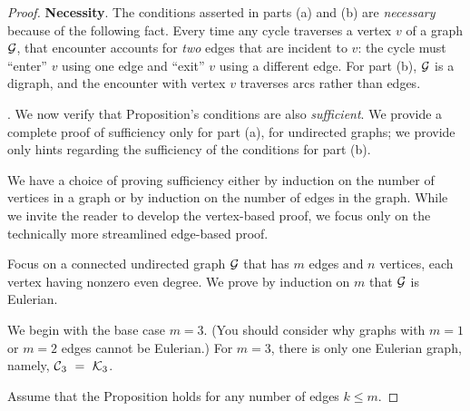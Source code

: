 \begin{proof}
{\bf Necessity}.
The conditions asserted in parts (a) and (b) are {\em necessary} because of the following fact.  Every time any cycle traverses a vertex $v$ of a graph $\mbox{$\cal G$}$, that encounter accounts for {\em two} edges that are incident to $v$: the cycle must ``enter'' $v$ using one edge and ``exit'' $v$ using a different edge.   For part (b), $\mbox{$\cal G$}$ is a digraph, and the encounter with vertex $v$ traverses arcs rather than edges.

\medskip

.
We now verify that Proposition's conditions are also {\em sufficient}.  We provide  a complete proof of sufficiency only for part (a), for undirected graphs; we provide only hints regarding the sufficiency of the conditions for part (b).

\smallskip

We have a choice of proving sufficiency either by induction on the number of vertices in a 
graph or by induction on the number of edges in the graph.  While we invite the reader to 
develop the vertex-based proof, we focus only on the technically more streamlined edge-based proof. 

\medskip

Focus on a connected undirected graph $\mbox{$\cal G$}$ that has $m$ edges and $n$ vertices, each vertex having nonzero even degree.  We prove by induction on $m$ that $\mbox{$\cal G$}$ is Eulerian.

\smallskip

We begin with the base case $m=3$.  (You should consider why graphs with $m=1$ or $m=2$ edges cannot be Eulerian.)  For $m=3$, there is only one Eulerian graph, namely, 
$\mbox{$\cal C$}_3 \ = \ \mbox{$\cal K$}_3$.

\smallskip

Assume that the Proposition holds for any number of edges $k \leq m$.

\smallskip


\end{proof}
